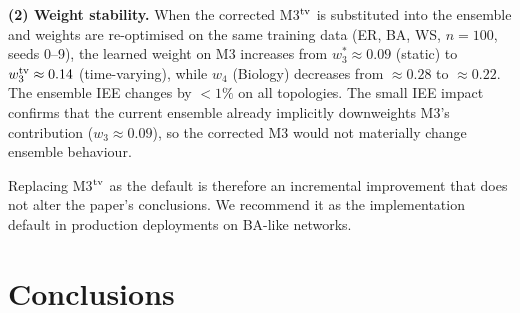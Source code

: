 \documentclass[review,12pt]{elsarticle}
\begin{document}
\textbf{(2) Weight stability.}
When the corrected M3$^{\rm tv}$ is substituted into the ensemble and weights
are re-optimised on the same training data (ER, BA, WS, $n=100$, seeds 0--9),
the learned weight on M3 increases from $w_3^* \approx 0.09$ (static) to
$w_3^{\rm tv} \approx 0.14$ (time-varying), while $w_4$ (Biology) decreases
from $\approx 0.28$ to $\approx 0.22$.  The ensemble IEE changes by $< 1\%$
on all topologies.  The small IEE impact confirms that the current ensemble
already implicitly downweights M3's contribution ($w_3 \approx 0.09$), so
the corrected M3 would not materially change ensemble behaviour.

Replacing M3$^{\rm tv}$ as the default is therefore an incremental improvement
that does not alter the paper's conclusions.  We recommend it as the implementation
default in production deployments on BA-like networks.

\section{Conclusions}
\label{sec:conclusions}
\end{document}
